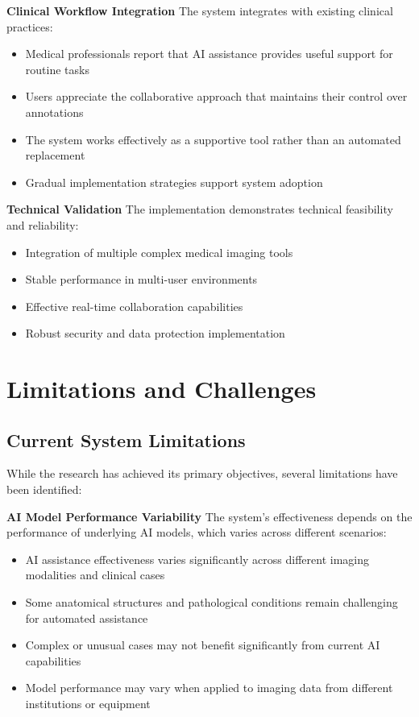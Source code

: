 \textbf{Clinical Workflow Integration}
The system integrates with existing clinical practices:
\begin{itemize}
    \item Medical professionals report that AI assistance provides useful support for routine tasks
    \item Users appreciate the collaborative approach that maintains their control over annotations
    \item The system works effectively as a supportive tool rather than an automated replacement
    \item Gradual implementation strategies support system adoption
\end{itemize}

\textbf{Technical Validation}
The implementation demonstrates technical feasibility and reliability:
\begin{itemize}
    \item Integration of multiple complex medical imaging tools
    \item Stable performance in multi-user environments
    \item Effective real-time collaboration capabilities
    \item Robust security and data protection implementation
\end{itemize}

\section{Limitations and Challenges}

\subsection{Current System Limitations}

While the research has achieved its primary objectives, several limitations have been identified:

\textbf{AI Model Performance Variability}
The system's effectiveness depends on the performance of underlying AI models, which varies across different scenarios:

\begin{itemize}
    \item AI assistance effectiveness varies significantly across different imaging modalities and clinical cases
    \item Some anatomical structures and pathological conditions remain challenging for automated assistance
    \item Complex or unusual cases may not benefit significantly from current AI capabilities
    \item Model performance may vary when applied to imaging data from different institutions or equipment
\end{itemize}

